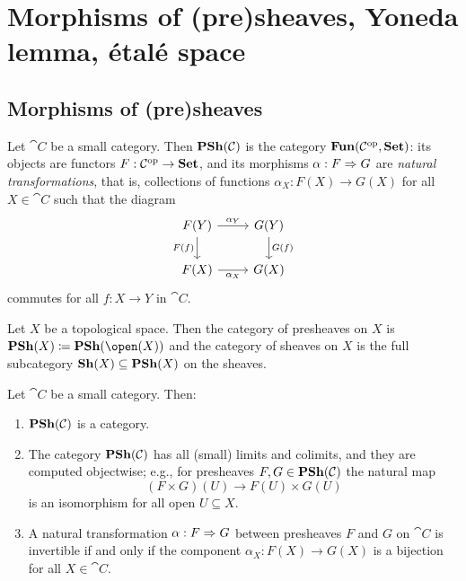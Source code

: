 \chapter{Morphisms of (pre)sheaves, Yoneda lemma, étalé space}


\section{Morphisms of (pre)sheaves}

\begin{defn}
Let $\cat C$ be a small category.
Then $\operatorname{\mathbf{PSh}}(\mathcal{C})$ is the category $\operatorname{\mathbf{Fun}}(\mathcal{C}^{\mathrm{op}},\mathbf{Set})$: its objects are functors $F\colon\cat C\opp\to\catSet$, and its morphisms $\alpha\colon F\To G$ are \emph{natural transformations}, that is, collections of functions $\alpha_X\colon F(X)\to G(X)$ for all $X\in\cat C$ such that the diagram
\begin{equation*}
    \begin{tikzcd}
        F(Y) \ar[r, "\alpha_Y"] \ar[d, "F(f)"'] & G(Y) \ar[d, "G(f)"] \\
        F(X) \ar[r, "\alpha_X"'] & G(X)
    \end{tikzcd}
\end{equation*}
commutes for all $f\colon X\to Y$ in $\cat C$.
\end{defn}

\begin{defn}
Let $X$ be a topological space.
Then the category of presheaves on $X$ is $\catPresheaf(X)\coloneqq\catPresheaf(\open(X))$ and the category of sheaves on $X$ is the full subcategory $\operatorname{\mathbf{Sh}}(X)\subseteq\operatorname{\mathbf{PSh}}(X)$ on the sheaves.
\end{defn}

\begin{lem}
Let $\cat C$ be a small category.
Then:
\begin{enumerate}
\item $\operatorname{\mathbf{PSh}}(\mathcal{C})$ is a category.
\item The category $\operatorname{\mathbf{PSh}}(\mathcal{C})$ has all (small) limits and colimits, and they are computed objectwise; e.g., for presheaves $F,G\in\operatorname{\mathbf{PSh}}(\mathcal{C})$ the natural map
    \[ (F\times G)(U) \to F(U)\times G(U) \]
    is an isomorphism for all open $U\subseteq X$.
\item A natural transformation $\alpha\colon F\To G$ between presheaves $F$ and $G$ on $\cat C$ is invertible if and only if the component $\alpha_X\colon F(X)\to G(X)$ is a bijection for all $X\in\cat C$.
\end{enumerate}
\end{lem}

